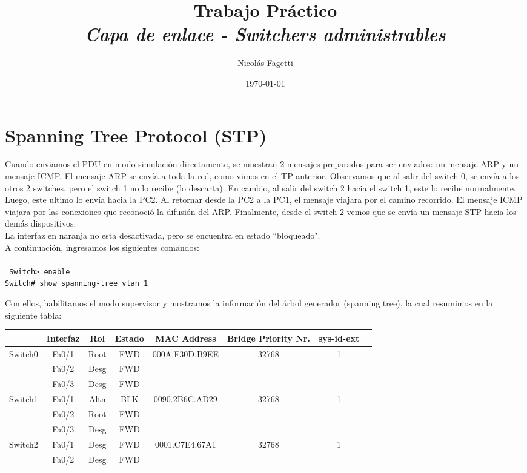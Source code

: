 \documentclass{article}
\title{ Trabajo Práctico \\ 
    \vspace{15}
    \textit{Capa de enlace - Switchers administrables} \\
}
\author{Nicolás Fagetti}
\date{\today}
\begin{document}
\maketitle

\section{Spanning Tree Protocol (STP)}

Cuando enviamos el PDU en modo simulación directamente, se muestran 2 mensajes preparados para ser enviados: un mensaje ARP y un mensaje ICMP. 
El mensaje ARP se envía a toda la red, como vimos en el TP anterior. Observamos que al salir del switch 0, se envía a los otros 2 switches, pero el switch 1 no lo recibe (lo descarta). En cambio, al salir del switch 2 hacia el switch 1, este lo recibe normalmente. Luego, este ultimo lo envía hacia la PC2. Al retornar desde la PC2 a la PC1, el mensaje viajara por el camino recorrido. 
El mensaje ICMP viajara por las conexiones que reconoció la difusión del ARP.
Finalmente, desde el switch 2 vemos que se envía un mensaje STP hacia los demás dispositivos. \\

La interfaz en naranja no esta desactivada, pero se encuentra en estado ``bloqueado". \\

A continuación, ingresamos los siguientes comandos: \\\\
\texttt{    Switch>\vspace{1} enable \\ 
            Switch\#\vspace{1} show spanning-tree vlan 1 \\ 
        }

Con ellos, habilitamos el modo supervisor y mostramos la información del árbol generador (spanning tree), la cual resumimos en la siguiente tabla: \\

\begin{tabular}{ | l || c | c | c | c | c | c | c |}
   \hline
    &  Interfaz	& Rol &	Estado & MAC Address & Bridge Priority Nr. & sys-id-ext \\
   \hline
   \multirow{3}{*}{Switch0} & Fa0/1 & Root	& FWD & \multirow{3}{*}{000A.F30D.B9EE} & \multirow{3}{*}{32768} & 1 \\
     & Fa0/2	& Desg & FWD & & \\
     & Fa0/3	& Desg & FWD & & \\
   \hline
   \multirow{3}{*}{Switch1} & Fa0/1 & Altn	& BLK & \multirow{3}{*}{0090.2B6C.AD29} & \multirow{3}{*}{32768} & 1 \\
     & Fa0/2	& Root & FWD & & \\
     & Fa0/3	& Desg & FWD & & \\
   \hline
   \multirow{2}{*}{Switch2} & Fa0/1 & Desg	& FWD & \multirow{2}{*}{0001.C7E4.67A1} & \multirow{2}{*}{32768} & 1 \\
     & Fa0/2	& Desg & FWD & & \\
   \hline
\end{tabular}
\end{document}
